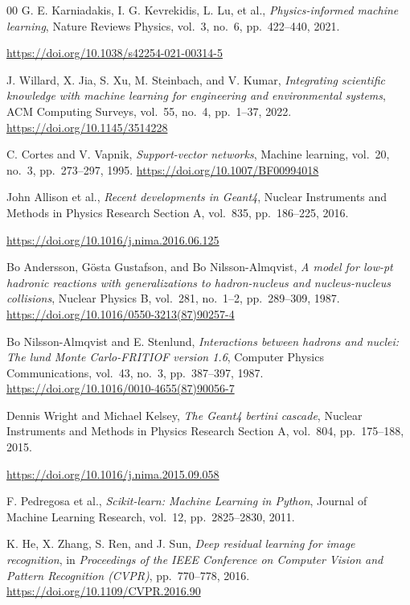 \documentclass[preprint,12pt]{elsarticle}
\newcommand{\doi}[1]{\url{https://doi.org/#1}}
\begin{document}
\begin{thebibliography}{00}
  G. E. Karniadakis, I. G. Kevrekidis, L. Lu, et al.,
  \textit{Physics-informed machine learning},
  Nature Reviews Physics, vol.~3, no.~6, pp.~422--440, 2021.

  \doi{10.1038/s42254-021-00314-5}

  J. Willard, X. Jia, S. Xu, M. Steinbach, and V. Kumar,
  \textit{Integrating scientific knowledge with machine learning for engineering and environmental systems},
  ACM Computing Surveys, vol.~55, no.~4, pp.~1--37, 2022.
  \doi{10.1145/3514228}

  C. Cortes and V. Vapnik,
  \textit{Support-vector networks},
  Machine learning, vol.~20, no.~3, pp.~273--297, 1995.
  \doi{10.1007/BF00994018}

  John Allison et al.,
  \textit{Recent developments in Geant4},
  Nuclear Instruments and Methods in Physics Research Section A,
  vol.~835, pp.~186--225,
  2016.

  \doi{10.1016/j.nima.2016.06.125}

  Bo Andersson, G{\"o}sta Gustafson, and Bo Nilsson-Almqvist,
  \textit{A model for low-pt hadronic reactions with generalizations to hadron-nucleus and nucleus-nucleus collisions},
  Nuclear Physics B,
  vol.~281, no.~1--2, pp.~289--309,
  1987.
  \doi{10.1016/0550-3213(87)90257-4}

  Bo Nilsson-Almqvist and E. Stenlund,
  \textit{Interactions between hadrons and nuclei: The lund Monte Carlo-FRITIOF version 1.6},
  Computer Physics Communications,
  vol.~43, no.~3, pp.~387--397,
  1987.
  \doi{10.1016/0010-4655(87)90056-7}

  Dennis Wright and Michael Kelsey,
  \textit{The Geant4 bertini cascade},
  Nuclear Instruments and Methods in Physics Research Section A,
  vol.~804, pp.~175--188,
  2015.


  \doi{10.1016/j.nima.2015.09.058}


  F. Pedregosa et al.,
  \textit{Scikit-learn: Machine Learning in Python},
  Journal of Machine Learning Research, vol.~12, pp.~2825--2830, 2011.

  K. He, X. Zhang, S. Ren, and J. Sun,
  \textit{Deep residual learning for image recognition},
  in \textit{Proceedings of the IEEE Conference on Computer Vision and Pattern Recognition (CVPR)},
  pp.~770--778,
  2016.
  \doi{10.1109/CVPR.2016.90}


\end{thebibliography}
\end{document}
